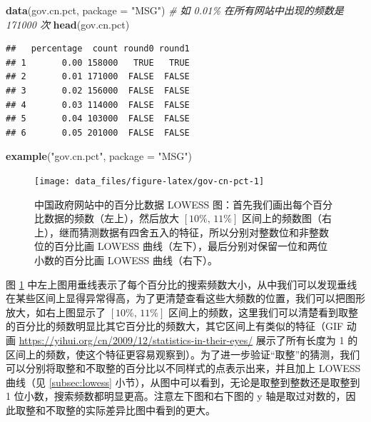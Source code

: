 \documentclass[
  b5paper,
  UTF8,twoside]{book}
\newenvironment{Shaded}{\begin{snugshade}}{\end{snugshade}}
\newcommand{\AttributeTok}[1]{\textcolor[rgb]{0.13,0.29,0.53}{#1}}
\newcommand{\CommentTok}[1]{\textcolor[rgb]{0.56,0.35,0.01}{\textit{#1}}}
\newcommand{\FunctionTok}[1]{\textcolor[rgb]{0.13,0.29,0.53}{\textbf{#1}}}
\newcommand{\NormalTok}[1]{#1}
\newcommand{\StringTok}[1]{\textcolor[rgb]{0.31,0.60,0.02}{#1}}
\begin{document}
\begin{Shaded}
\begin{Highlighting}[]
\FunctionTok{data}\NormalTok{(gov.cn.pct, }\AttributeTok{package =} \StringTok{"MSG"}\NormalTok{)}
\CommentTok{\# 如 0.01\% 在所有网站中出现的频数是 171000 次}
\FunctionTok{head}\NormalTok{(gov.cn.pct)}
\end{Highlighting}
\end{Shaded}

\begin{verbatim}
##   percentage  count round0 round1
## 1       0.00 158000   TRUE   TRUE
## 2       0.01 171000  FALSE  FALSE
## 3       0.02 156000  FALSE  FALSE
## 4       0.03 114000  FALSE  FALSE
## 5       0.04 103000  FALSE  FALSE
## 6       0.05 201000  FALSE  FALSE
\end{verbatim}

\begin{Shaded}
\begin{Highlighting}[]
\FunctionTok{example}\NormalTok{(}\StringTok{"gov.cn.pct"}\NormalTok{, }\AttributeTok{package =} \StringTok{"MSG"}\NormalTok{)}
\end{Highlighting}
\end{Shaded}

\begin{figure}

{\centering \texttt{[image: data\_files/figure-latex/gov-cn-pct-1]} 

}

\caption[中国政府网站中的百分比数据 LOWESS 图]{中国政府网站中的百分比数据 LOWESS 图：首先我们画出每个百分比数据的频数（左上），然后放大 \([10\%,\,11\%]\) 区间上的频数图（右上），继而猜测数据有四舍五入的特征，所以分别对整数位和非整数位的百分比画 LOWESS 曲线（左下），最后分别对保留一位和两位小数的百分比画 LOWESS 曲线（右下）。}\label{fig:gov-cn-pct}
\end{figure}



图 \ref{fig:gov-cn-pct} 中左上图用垂线表示了每个百分比的搜索频数大小，从中我们可以发现垂线在某些区间上显得异常得高，为了更清楚查看这些大频数的位置，我们可以把图形放大，如右上图显示了 \([10\%,\,11\%]\) 区间上的频数，这里我们可以清楚看到取整的百分比的频数明显比其它百分比的频数大，其它区间上有类似的特征（GIF 动画 \url{https://yihui.org/cn/2009/12/statistics-in-their-eyes/} 展示了所有长度为 1 的区间上的频数，使这个特征更容易观察到）。为了进一步验证``取整''的猜测，我们可以分别将取整和不取整的百分比以不同样式的点表示出来，并且加上 LOWESS 曲线（见 \ref{subsec:lowess} 小节），从图中可以看到，无论是取整到整数还是取整到 1 位小数，搜索频数都明显更高。注意左下图和右下图的 y 轴是取过对数的，因此取整和不取整的实际差异比图中看到的更大。
\end{document}
